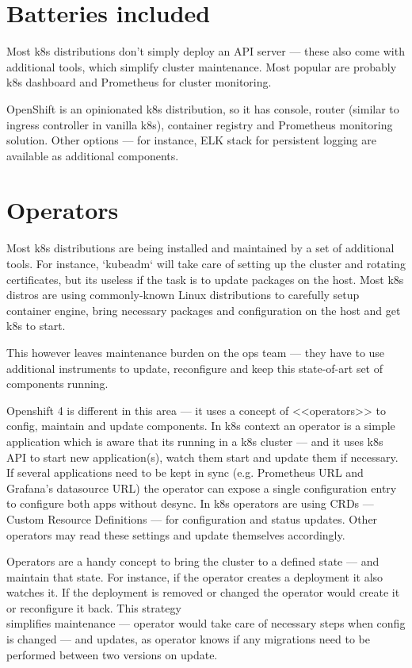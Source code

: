 \documentclass[10pt, a5paper]{article}
\begin{document}
\section*{Batteries included}

Most k8s distributions don't simply deploy an API server --- these also come with additional tools, which
simplify cluster maintenance. Most popular are probably k8s dashboard and Prometheus for cluster monitoring.

OpenShift is an opinionated k8s distribution, so it has console, router (similar to ingress controller in vanilla k8s),
container registry and Prometheus monitoring solution. Other options --- for instance, ELK stack for
persistent logging are available as additional components.

\section*{Operators}

Most k8s distributions are being installed and maintained by a set of additional tools. For instance,
`kubeadm` will take care of setting up the cluster and rotating certificates, but its useless if the task
is to update packages on the host. Most k8s distros are using commonly-known Linux distributions to
carefully setup container engine, bring necessary packages and configuration on the host and get k8s to start.

This however leaves maintenance burden on the ops team --- they have to use additional instruments to
update, reconfigure and keep this state-of-art set of components running.

Openshift 4 is different in this area --- it uses a concept of <<operators>> to config, maintain and update components.
In k8s context an operator is a simple application which is aware that its running in a k8s cluster --- and
it uses k8s API to start new application(s), watch them start and update them if necessary. If several
applications need to be kept in sync (e.g. Prometheus URL and Grafana's datasource URL) the operator can
expose a single configuration entry to configure both apps without desync. In k8s operators are using
CRDs --- Custom Resource Definitions --- for configuration and status updates. Other operators may read
these settings and update themselves accordingly.

Operators are a handy concept to bring the cluster to a defined state --- and maintain that state. For
instance, if the operator creates a deployment it also watches it. If the deployment is removed or
changed the operator would create it or reconfigure it back. This strategy \\simplifies maintenance ---
operator would take care of necessary steps when config is changed --- and updates, as operator knows
if any \linebreak migrations need to be performed between two versions on update.
\end{document}
